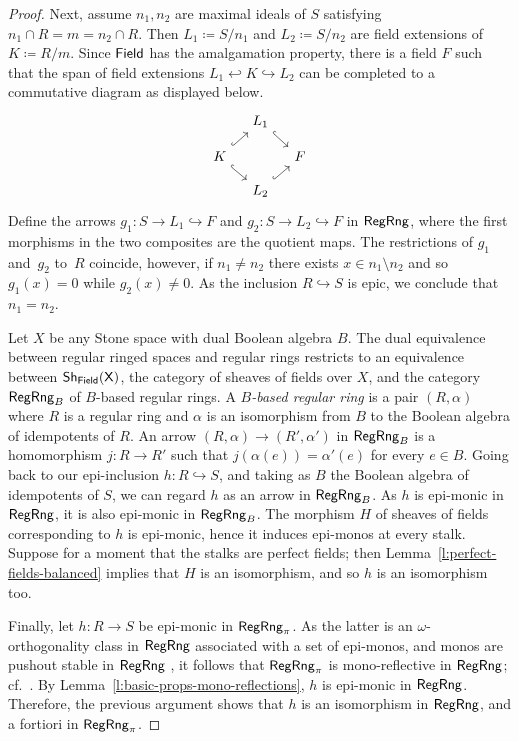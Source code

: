 \documentclass[a4paper,10pt,reqno]{amsart}
\theoremstyle{definition}
\theoremstyle{remark}
\newcommand{\RegRng}{{\sf RegRng}}						%
\newcommand{\Field}{{\sf Field}}							%
\newcommand{\into}{\hookrightarrow}						%
\begin{document}
\begin{proof}
Next, assume $n_{1},n_{2}$ are maximal ideals of $S$ satisfying $n_{1}\cap R = m = n_{2}\cap R$. 
Then $L_{1}\coloneqq S/n_{1}$ and $L_{2}\coloneqq S/n_{2}$ are field extensions of $K\coloneqq R/m$. Since $\Field$ has the amalgamation property, there is a field $F$ such that the span of field extensions $L_{1}\hookleftarrow K \into L_{2}$ can be completed to a commutative diagram as displayed below.
\[\begin{tikzcd}[row sep=1em, column sep=1em]
{} & L_{1} \arrow[hookrightarrow]{dr} & \\
K \arrow[hookrightarrow]{ur} \arrow[hookrightarrow]{dr} & & F \\
{} & L_{2} \arrow[hookrightarrow]{ur} &
\end{tikzcd}\]
Define the arrows $g_{1}\colon S\to L_{1}\into F$ and $g_{2}\colon S\to L_{2}\into F$ in $\RegRng$, where the first morphisms in the two composites are the quotient maps. 
The restrictions of $g_{1}$ and~$g_{2}$ to~$R$ coincide, however, if $n_{1}\neq n_{2}$ there exists $x\in n_{1}\setminus n_{2}$ and so $g_{1}(x) = 0$ while $g_{2}(x)\neq 0$. As the inclusion $R\into S$ is epic, we conclude that $n_{1}=n_{2}$. 

Let $X$ be any Stone space with dual Boolean algebra $B$. The dual equivalence between regular ringed spaces and regular rings restricts to an equivalence between $\sf{Sh}_{\Field}(X)$, the category of sheaves of fields over $X$, and the category $\RegRng_{B}$ of $B$-based regular rings. A \emph{$B$-based regular ring} is a pair $(R,\alpha)$ where $R$ is a regular ring and $\alpha$ is an isomorphism from $B$ to the Boolean algebra of idempotents of $R$. An arrow $(R,\alpha)\to (R',\alpha')$ in $\RegRng_{B}$ is a homomorphism $j\colon R\to R'$ such that $j(\alpha(e)) = \alpha'(e)$ for every $e\in B$. Going back to our epi-inclusion $h\colon R\into S$, and taking as $B$ the Boolean algebra of idempotents of $S$, we can regard $h$ as an arrow in $\RegRng_{B}$. As $h$ is epi-monic in $\RegRng$, it is also epi-monic in $\RegRng_{B}$. The morphism $H$ of sheaves of fields corresponding to $h$ is epi-monic, hence it induces epi-monos at every stalk. Suppose for a moment that the stalks are perfect fields; then Lemma~\ref{l:perfect-fields-balanced} implies that $H$ is an isomorphism, and so $h$ is an isomorphism too.

Finally, let $h\colon R\to S$ be epi-monic in $\RegRng_{\pi}$. As the latter is an $\omega$-orthogonality class in $\RegRng$ associated with a set of epi-monos, and monos are pushout stable in $\RegRng$ \cite[Theorem~1.6]{Cornish1977}, it follows that $\RegRng_{\pi}$ is mono-reflective in $\RegRng$; cf.\ \cite[\S 1.37]{ar94book}. By Lemma~\ref{l:basic-props-mono-reflections}, $h$ is epi-monic in $\RegRng$. Therefore, the previous argument shows that $h$ is an isomorphism in $\RegRng$, and a fortiori in $\RegRng_{\pi}$.
\end{proof}
\end{document}
